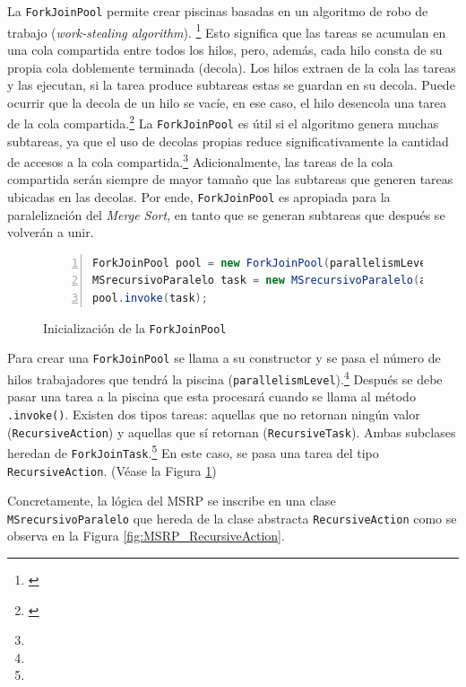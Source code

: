 \documentclass[titlepage]{article}
\begin{document}
La \lstinline{ForkJoinPool} permite crear piscinas basadas en un algoritmo de robo de trabajo (\textit{work-stealing algorithm}). \footnote{\cite{Ramgir2017-mv}} Esto significa que las tareas se acumulan en una cola compartida entre todos los hilos, pero, además, cada hilo consta de su propia cola doblemente terminada (decola). Los hilos extraen de la cola las tareas y las ejecutan, si la tarea produce subtareas estas se guardan en su decola. Puede ocurrir que la decola de un hilo se vacíe, en ese caso, el hilo desencola una tarea de la cola compartida.\footnote{\cite{kumar_2024}} La \lstinline{ForkJoinPool} es útil si el algoritmo genera muchas subtareas, ya que el uso de decolas propias reduce significativamente la cantidad de accesos a la cola compartida.\footnote[17]{} Adicionalmente, las tareas de la cola compartida serán siempre de mayor tamaño que las subtareas que generen tareas ubicadas en las decolas. Por ende, \lstinline{ForkJoinPool} es apropiada para la paralelización del \textit{Merge Sort}, en tanto que se generan subtareas que después se volverán a unir.

\begin{figure}[h]
	\begin{lstlisting}[language=java, frame=single, numbers=left]
ForkJoinPool pool = new ForkJoinPool(parallelismLevel);
MSrecursivoParalelo task = new MSrecursivoParalelo(arr, aux, left, right);
pool.invoke(task);
	\end{lstlisting}
	\caption{Inicialización de la \lstinline{ForkJoinPool}}
	\label{fig:creacionForkJoinPool}
\end{figure}

Para crear una \lstinline{ForkJoinPool} se llama a su constructor y se pasa el número de hilos trabajadores que tendrá la piscina (\lstinline{parallelismLevel}).\footnote[17]{} Después se debe pasar una tarea a la piscina que esta procesará cuando se llama al método \lstinline{.invoke()}. Existen dos tipos tareas: aquellas que no retornan ningún valor (\lstinline{RecursiveAction}) y aquellas que sí retornan (\lstinline{RecursiveTask}). Ambas subclases heredan de \lstinline{ForkJoinTask}.\footnote[17]{} En este caso, se pasa una tarea del tipo \lstinline{RecursiveAction}. (Véase la Figura \ref{fig:creacionForkJoinPool})

Concretamente, la lógica del MSRP se inscribe en una clase \lstinline{MSrecursivoParalelo} que hereda de la clase abstracta \lstinline{RecursiveAction} como se observa en la Figura \ref{fig:MSRP_RecursiveAction}. 
\end{document}
